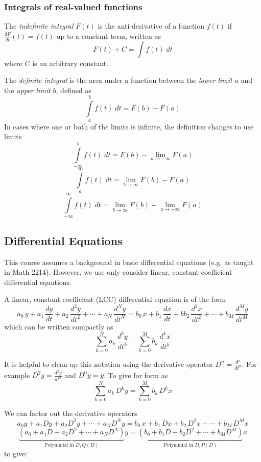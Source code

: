 \subsubsection*{Integrals of real-valued functions}

The \textit{indefinite integral} $F(t)$ is the anti-derivative of a function $f(t)$ if $\frac{dF}{dt}(t) = f(t)$ up to a constant term, written as
\[
F(t) + C = \int f(t)\; dt
\]
where $C$ is an arbitrary constant.

The \textit{definite integral} is the area under a function between the \textit{lower limit} $a$ and the \textit{upper limit} $b$, defined as
\[
\int\limits_{a}^{b} f(t) \; dt = F(b) - F(a)
\]
In cases where one or both of the limits is infinite, the definition changes to use limits
\[
\int\limits_{-\infty}^{b} f(t) \; dt = F(b) - \lim_{a\rightarrow -\infty} F(a)
\]
\[
\int\limits_{a}^{\infty} f(t) \; dt = \lim_{b\rightarrow \infty} F(b) - F(a)
\]
\[
\int\limits_{-\infty}^{\infty} f(t) \; dt = \lim_{b\rightarrow \infty} F(b) - \lim_{a\rightarrow -\infty} F(a)
\]

\subsection{Differential Equations}

This course assumes a background in basic differential equations (e.g. as taught in Math 2214). However, we use only consider linear, constant-coefficient differential equations.

A linear, constant coefficient (LCC) differential equation is of the form
\[
a_0\, y + a_1\, \frac{dy}{dt} + a_2\, \frac{d^2y}{dt^2} + \cdots + a_N\, \frac{d^Ny}{dt^N}  = b_0\, x + b_1\, \frac{dx}{dt} + bb_2\, \frac{d^2x}{dt^2} + \cdots + b_M\, \frac{d^My}{dt^M}
\]
which can be written compactly as
\[
\sum\limits_{k = 0}^{N} a_k\, \frac{d^ky}{dt^k} = \sum\limits_{k = 0}^{M} b_k\, \frac{d^kx}{dt^k}
\]

It is helpful to clean up this notation using the derivative operator $D^n = \frac{d^n}{dt^n}$. For example
$D^2y = \frac{d^2y}{dt^2}$ and $D^0 y= y$. To give for form as
\[
\sum\limits_{k = 0}^{N} a_k\, D^k y = \sum\limits_{k = 0}^{M} b_k\, D^k x
\]

We can factor out the derivative operators
\[
a_0y + a_1Dy + a_2D^2y + \cdots + a_ND^Ny  = b_0\, x + b_1\, Dx + b_2\, D^2x + \cdots + b_M\, D^M x
\]
\[
\underbrace{\left(a_0 + a_1D + a_2D^2 + \cdots + a_ND^N\right)}_{\text{Polynimial in } D, Q(D)} y = \underbrace{\left(b_0 + b_1 D + b_2 D^2 + \cdots + b_M D^M\right)}_{\text{Polynimial in } D, P(D)} x
\]
to give:
  
